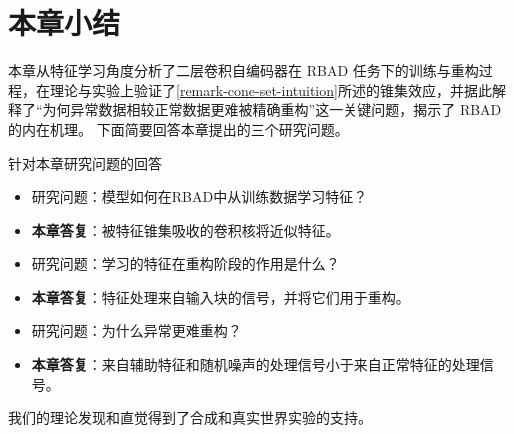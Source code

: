 
\section{本章小结}\label{sec-rbad-conclusion}
本章从特征学习角度分析了二层卷积自编码器在 RBAD 任务下的训练与重构过程，在理论与实验上验证了\cref{remark-cone-set-intuition}所述的锥集效应，并据此解释了“为何异常数据相较正常数据更难被精确重构”这一关键问题，揭示了 RBAD 的内在机理。
下面简要回答本章提出的三个研究问题。

\begin{mynote}{针对本章研究问题的回答}
    \begin{itemize}
        \item 研究问题：模型如何在RBAD中从训练数据学习特征？
        \item \textbf{本章答复}：被特征锥集吸收的卷积核将近似特征。
        \vspace{0.3em}
        \item 研究问题：学习的特征在重构阶段的作用是什么？
        \item \textbf{本章答复}：特征处理来自输入块的信号，并将它们用于重构。
        \vspace{0.3em}
        \item 研究问题：为什么异常更难重构？
        \item \textbf{本章答复}：来自辅助特征和随机噪声的处理信号小于来自正常特征的处理信号。
    \end{itemize}
\end{mynote}

我们的理论发现和直觉得到了合成和真实世界实验的支持。